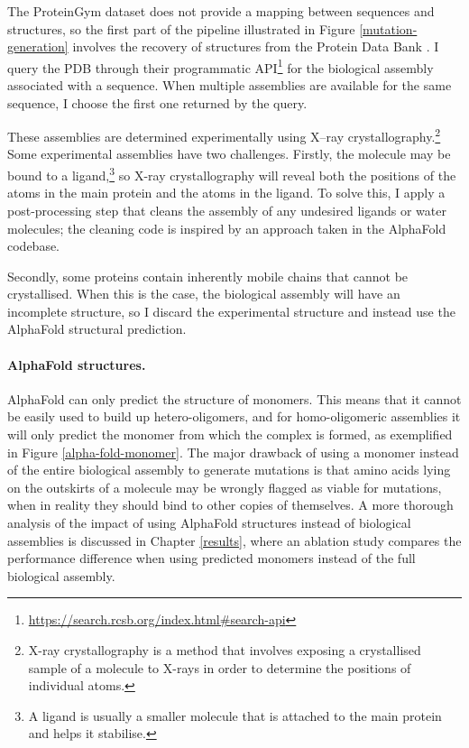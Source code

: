 The ProteinGym dataset does not provide a mapping between sequences and structures, so the first part of the pipeline illustrated in Figure \ref{mutation-generation} involves the recovery of structures from the Protein Data Bank \cite{rcsb_pdb}. I query the PDB through their programmatic API\footnote{\url{https://search.rcsb.org/index.html\#search-api}} for the biological assembly associated with a sequence. When multiple assemblies are available for the same sequence, I choose the first one returned by the query. 

These assemblies are determined experimentally using X–ray crystallography.\footnote{X-ray crystallography is a method that involves exposing a crystallised sample of a molecule to X-rays in order to determine the positions of individual atoms.} Some experimental assemblies have two challenges. Firstly, the molecule may be bound to a ligand,\footnote{A ligand is usually a smaller molecule that is attached to the main protein and helps it stabilise.} so X-ray crystallography will reveal both the positions of the atoms in the main protein and the atoms in the ligand. To solve this, I apply a post-processing step that cleans the assembly of any undesired ligands or water molecules; the cleaning code is inspired by an approach taken in the AlphaFold \cite{alphafold} codebase.

Secondly, some proteins contain inherently mobile chains that cannot be crystallised. When this is the case, the biological assembly will have an incomplete structure, so I discard the experimental structure and instead use the AlphaFold structural prediction.

\paragraph{AlphaFold structures.} AlphaFold can only predict the structure of monomers. This means that it cannot be easily used to build up hetero-oligomers, and for homo-oligomeric assemblies it will only predict the monomer from which the complex is formed, as exemplified in Figure \ref{alpha-fold-monomer}. The major drawback of using a monomer instead of the entire biological assembly to generate mutations is that amino acids lying on the outskirts of a molecule may be wrongly flagged as viable for mutations, when in reality they should bind to other copies of themselves. A more thorough analysis of the impact of using AlphaFold structures instead of biological assemblies is discussed in Chapter \ref{results}, where an ablation study compares the performance difference when using predicted monomers instead of the full biological assembly.

